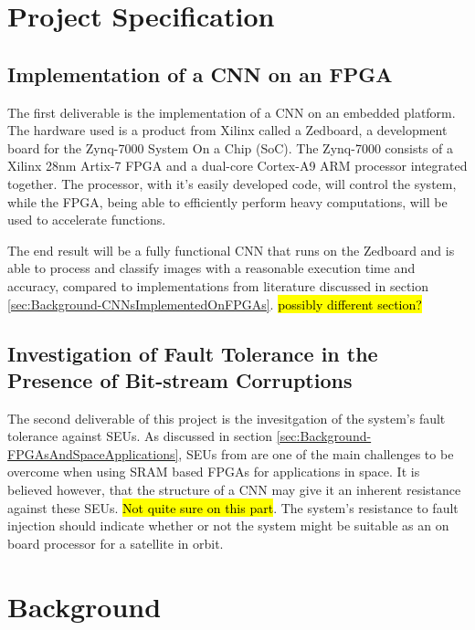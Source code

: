 \documentclass[11pt]{article}
\begin{document}
\section{Project Specification}
\label{sec:ProjSpec}

\subsection{Implementation of a CNN on an FPGA}
\label{sec:ProjSpec-ImplementationOfACNNOnAnFPGA}

The first deliverable is the implementation of a CNN on an embedded platform. The hardware used is a product from Xilinx called a Zedboard, a development board for the Zynq-7000 System On a Chip (SoC). The Zynq-7000 consists of a Xilinx 28nm Artix-7 FPGA and a dual-core Cortex-A9 ARM processor integrated together. The processor, with it's easily developed code, will control the system, while the FPGA, being able to efficiently perform heavy computations, will be used to accelerate functions.

The end result will be a fully functional CNN that runs on the Zedboard and is able to process and classify images with a reasonable execution time and accuracy, compared to implementations from literature discussed in section \ref{sec:Background-CNNsImplementedOnFPGAs}. \hl{possibly different section?}

\subsection{Investigation of Fault Tolerance in the Presence of Bit-stream Corruptions}
\label{sec:ProjSpec-InvestigationOfFaultToleranceInThePresenceOfBitstreamCorruptions}

The second deliverable of this project is the invesitgation of the system's fault tolerance against SEUs. As discussed in section \ref{sec:Background-FPGAsAndSpaceApplications}, SEUs from are one of the main challenges to be overcome when using SRAM based FPGAs for applications in space. It is believed however, that the structure of a CNN may give it an inherent resistance against these SEUs. \hl{Not quite sure on this part}. The system's resistance to fault injection should indicate whether or not the system might be suitable as an on board processor for a satellite in orbit.

\section{Background}
\label{sec:Background}
\end{document}
